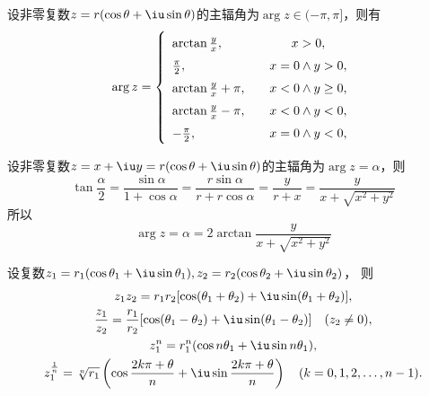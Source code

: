 \begin{theorem}
设非零复数\(z=r(\cos\theta+ \iu \sin\theta)\)的主辐角为\(\arg{z} \in (-\pi,\pi]\)，则有\begin{equation*}
\def\arraystretch{1.5}
\arg{z} = \left\{ \begin{array}{lc}
\arctan{\frac{y}{x}}, &\quad x > 0, \\
\frac{\pi}{2}, &\quad x = 0 \land y > 0, \\
\arctan{\frac{y}{x}} + \pi, &\quad x < 0 \land y \geq 0, \\
\arctan{\frac{y}{x}} - \pi, &\quad x < 0 \land y < 0, \\
-\frac{\pi}{2}, &\quad x = 0 \land y < 0,
\end{array} \right.
\end{equation*}
\end{theorem}

\begin{theorem}
设非零复数\(z = x + \iu y=r(\cos\theta+ \iu \sin\theta)\)的主辐角为\(\arg{z} = \alpha\)，则\begin{equation*}
\tan{\frac{\alpha}{2}}
= \frac{\sin\alpha}{1+\cos\alpha}
= \frac{r\sin\alpha}{r+r\cos\alpha}
= \frac{y}{r+x}
= \frac{y}{x+\sqrt{x^2+y^2}}
\end{equation*}所以\begin{equation*}
\arg{z} = \alpha
= 2 \arctan{ \frac{y}{x+\sqrt{x^2+y^2}} }
\end{equation*}
\end{theorem}

\begin{theorem}
设复数\(
	z_1 = r_1 (\cos\theta_1 + \iu \sin\theta_1),
	z_2 = r_2 (\cos\theta_2 + \iu \sin\theta_2)
\)，
则\begin{gather*}
	z_1 z_2
	= r_1 r_2 [\cos(\theta_1+\theta_2) + \iu \sin(\theta_1+\theta_2)], \\
	\frac{z_1}{z_2}
	= \frac{r_1}{r_2} [\cos(\theta_1-\theta_2) + \iu \sin(\theta_1-\theta_2)]
	\quad(z_2\neq0), \\
	z_1^n = r_1^n (\cos n\theta_1 + \iu \sin n\theta_1), \\
	z_1^{\frac1n} = \sqrt[n]{r_1} \left( \cos\frac{2k\pi+\theta}{n} + \iu \sin\frac{2k\pi+\theta}{n} \right)
	\quad(k=0,1,2,\dotsc,n-1).
\end{gather*}
\end{theorem}

